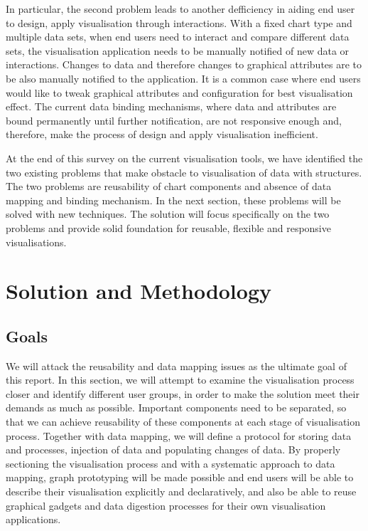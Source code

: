\documentclass[11pt, a4paper]{report}
\begin{document}
In particular, the second problem leads to another defficiency in aiding end user to design, apply visualisation through interactions. With a fixed chart type and multiple data sets, when end users need to interact and compare different data sets, the visualisation application needs to be manually notified of new data or interactions. Changes to data and therefore changes to graphical attributes are to be also manually notified to the application. It is a common case where end users would like to tweak graphical attributes and configuration for best visualisation effect. The current data binding mechanisms, where data and attributes are bound permanently until further notification, are not responsive enough and, therefore, make the process of design and apply visualisation inefficient.

At the end of this survey on the current visualisation tools, we have identified the two existing problems that make obstacle to visualisation of data with structures. The two problems are reusability of chart components and absence of data mapping and binding mechanism. In the next section, these problems will be solved with new techniques. The solution will focus specifically on the two problems and provide solid foundation for reusable, flexible and responsive visualisations.

\chapter{Solution and Methodology}
\section{Goals}
We will attack the reusability and data mapping issues as the ultimate goal of this report. In this section, we will attempt to examine the visualisation process closer and identify different user groups, in order to make the solution meet their demands as much as possible. Important components need to be separated, so that we can achieve reusability of these components at each stage of visualisation process. Together with data mapping, we will define a protocol for storing data and processes, injection of data and populating changes of data. By properly sectioning the visualisation process and with a systematic approach to data mapping, graph prototyping will be made possible and end users will be able to describe their visualisation explicitly and declaratively, and also be able to reuse graphical gadgets and data digestion processes for their own visualisation applications.
\end{document}
